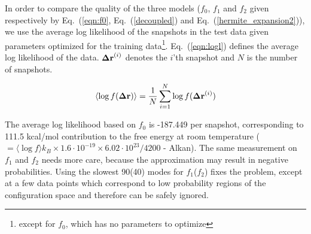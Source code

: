 \documentclass[prl,nofootinbib,twocolumn,floatfix,showpacs]{revtex4}
\begin{document}


In order to compare the quality of the three models ($f_0$, $f_1$ and
$f_2$ given respectively by Eq.~(\ref{eqn:f0}, Eq.~(\ref{decoupled})
and Eq.~(\ref{hermite_expansion2})), we use the average log likelihood
of the snapshots in the test data given parameters optimized for the
training data\footnote{except for $f_0$, which has no parameters to
optimize}.  Eq.~(\ref{eqn:logl}) defines the average log likelihood of
the data.  ${\bf\Delta r}^{(i)}$ denotes the $i$'th snapshot and $N$
is the number of snapshots.

\begin{equation}
\label{eqn:logl}
\left< \log f({\bf\Delta r}) \right> = \frac{1}{N} \sum_{i=1}^N \log f({\bf\Delta r}^{(i)})
\end{equation}

The average log likelihood based on $f_0$ is -187.449 per snapshot,
corresponding to 111.5 kcal/mol contribution to the free energy at
room temperature ( $= \langle\log f\rangle k_B\times 1.6\cdot
10^{-19}\times 6.02\cdot 10^{23} / 4200$ - Alkan). The same
measurement on $f_1$ and $f_2$ needs more care, because the
approximation may result in negative probabilities. Using the slowest
90(40) modes for $f_1$($f_2$) fixes the problem, except at a few data
points which correspond to low probability regions of the
configuration space and therefore can be safely ignored. 
\end{document}
